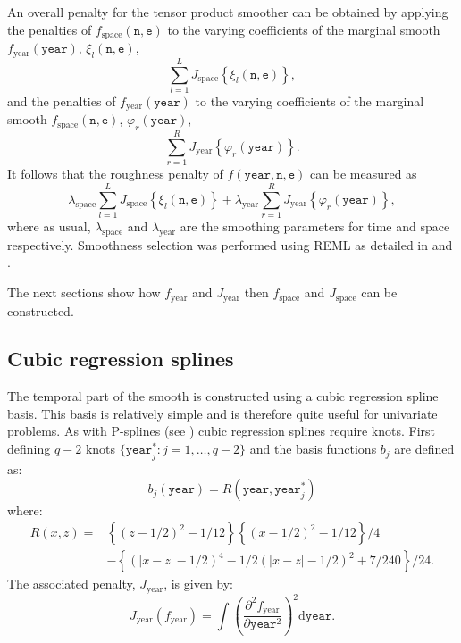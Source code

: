 An overall penalty for the tensor product smoother can be obtained by applying the penalties of $f_\text{space}(\texttt{n},\texttt{e})$ to the varying coefficients of the marginal smooth $f_\text{year}(\texttt{year})$, $\xi_l(\texttt{n},\texttt{e})$,
$$
\sum_{l=1}^L J_\text{space}\left\{  \xi_l(\texttt{n},\texttt{e}) \right\},
$$ 
and the penalties of $f_\text{year}(\texttt{year})$ to the varying coefficients of the marginal smooth $f_\text{space}(\texttt{n},\texttt{e})$, $\varphi_r(\texttt{year})$,  
$$
\sum_{r=1}^R J_\text{year}\left\{  \varphi_r(\texttt{year}) \right\}.
$$ 
It follows that the roughness penalty of $f(\texttt{year},\texttt{n},\texttt{e})$ can be measured as 
$$
\lambda_\text{space} \sum_{l=1}^L J_\text{space}\left\{  \xi_l(\texttt{n},\texttt{e}) \right\} + \lambda_\text{year} \sum_{r=1}^R J_\text{year}\left\{  \varphi_r(\texttt{year}) \right\},
$$
where as usual, $\lambda_\text{space}$ and $\lambda_\text{year}$ are the smoothing parameters for time and space respectively. Smoothness selection was performed using REML as detailed in  and .

The next sections show how $f_\text{year}$ and $J_\text{year}$ then $f_\text{space}$ and $J_\text{space}$ can be constructed.   

\subsection{Cubic regression splines}

The temporal part of the smooth is constructed using a cubic regression spline basis. This basis is relatively simple and is therefore quite useful for univariate problems. As with P-splines (see ) cubic regression splines require knots. First defining $q-2$ knots $\{\texttt{year}_j^* : j=1,\ldots,q-2\}$ and the basis functions $b_j$ are defined as:
\begin{equation*}
b_j(\texttt{year}) = R(\texttt{year},\texttt{year}_j^*)
\end{equation*}
where:
\begin{align*}
R(x,z) =& \left\{ \left ( z-1/2 \right )^2 -1/12 \right\} \left\{ \left (x-1/2 \right )^2 - 1/12 \right \}/4 \\
 & - \left\{ \left(\lvert x-z\rvert -1/2 \right)^4 -1/2\left(\lvert x-z \rvert -1/2 \right)^2 +7/240 \right\}/24.
\end{align*}
The associated penalty, $J_\text{year}$, is given by:
\begin{equation*}
J_\text{year}(f_\text{year})=\int\left( \frac{\partial^2 f_\text{year}}{\partial \texttt{year}^2} \right)^2 \text{d}\texttt{year}.
\end{equation*}

